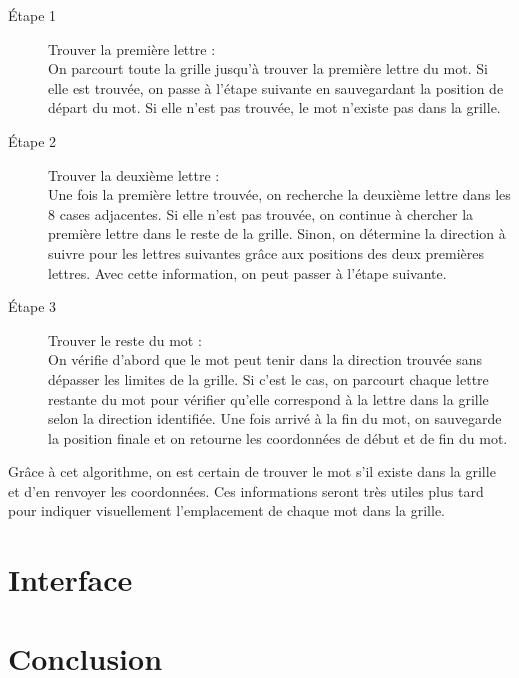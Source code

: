 \documentclass{article}
\begin{document}
\begin{description}
    \item[Étape 1] Trouver la première lettre :\\
    On parcourt toute la grille jusqu'à trouver la première lettre du mot. Si elle est trouvée, on passe à l'étape suivante en sauvegardant la position de départ du mot. Si elle n'est pas trouvée, le mot n'existe pas dans la grille.\\
    
    \item[Étape 2] Trouver la deuxième lettre :\\
    Une fois la première lettre trouvée, on recherche la deuxième lettre dans les 8 cases adjacentes. Si elle n'est pas trouvée, on continue à chercher la première lettre dans le reste de la grille. Sinon, on détermine la direction à suivre pour les lettres suivantes grâce aux positions des deux premières lettres. Avec cette information, on peut passer à l'étape suivante.\\
    
    \item[Étape 3] Trouver le reste du mot :\\
    On vérifie d'abord que le mot peut tenir dans la direction trouvée sans dépasser les limites de la grille. Si c'est le cas, on parcourt chaque lettre restante du mot pour vérifier qu'elle correspond à la lettre dans la grille selon la direction identifiée. Une fois arrivé à la fin du mot, on sauvegarde la position finale et on retourne les coordonnées de début et de fin du mot.\\
\end{description}
Grâce à cet algorithme, on est certain de trouver le mot s'il existe dans la grille et d'en renvoyer les coordonnées. Ces informations seront très utiles plus tard pour indiquer visuellement l'emplacement de chaque mot dans la grille.

\section{Interface}
\newpage
\section{Conclusion}
\end{document}
